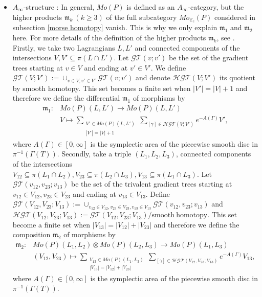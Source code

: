 \documentclass[12pt,reqno]{amsart}
\newcommand{\fm}{{\mathfrak{m}}}
\newcommand{\cE}{{\mathcal{E}}}
\theoremstyle{definition}
\begin{document}
\begin{itemize}
\item $A_\infty$-structure : In general, $Mo(P)$ is defined as an $A_\infty$-category, but the higher products $\fm_k\ (k\geq3)$ of the full subcategory $Mo_{\cE_c}(P)$ considered in subsection \ref{morse homotopy} vanish. 
This is why we only explain $\fm_1$ and $\fm_2$ here. For more details of the definition of the higher products $\fm_k$, see \cite{fut-kaj1}. 
Firstly, we take two Lagrangians $L,L'$ and connected components of the intersections $V,V'\subseteq \pi(L\cap L')$. Let $\mathcal{GT}(v;v')$ be the set of the gradient trees starting at $v\in V$ and ending at $v'\in V'$. We define $\mathcal{GT}(V;V') := \cup_{{v}\in V,v'\in V'}\mathcal{GT}(v;v')$ and denote $\mathcal{HGT}(V;V')$ its quotient by smooth homotopy. This set becomes a finite set when $|V'|=|V|+1$ and therefore we define the differential $\fm_1$ of morphisms by
\begin{equation*}
\begin{split}
\fm_1:&Mo(P)(L,L')\longrightarrow Mo(P)(L,L')\\
&V \longmapsto \sum_{\substack{V'\in Mo(P)(L,L')\\|V'|=|V|+1}}\sum_{[\gamma]\in \mathcal{HGT}(V;V')}e^{-A(\Gamma)}V',
\end{split}
\end{equation*}
where $A(\Gamma)\in[0,\infty]$ is the symplectic area of the piecewise smooth disc in $\pi^{-1}(\Gamma(T))$.
Secondly, take a triple $(L_1,L_2,L_3)$, connected components of the intersections $V_{12}\subseteq \pi(L_1\cap L_2), V_{23}\subseteq\pi(L_2\cap L_3), V_{13}\subseteq\pi(L_1\cap L_3)$. Let $\mathcal{GT}(v_{12},v_{23};v_{13})$ be the set of the trivalent gradient trees starting at $v_{12}\in V_{12}, v_{23}\in V_{23}$ and ending at $v_{13}\in V_{13}$. Define $\mathcal{GT}(V_{12},V_{23};V_{13}) := \cup_{v_{12}\in V_{12},v_{23}\in V_{23},v_{13}\in V_{13}}\mathcal{GT}(v_{12},v_{23};v_{13})$ and $\mathcal{HGT}(V_{12},V_{23};V_{13}):=\mathcal{GT}(V_{12},V_{23};V_{13})/\mathrm{smooth\ homotopy}$. This set become a finite set when $|V_{13}|=|V_{12}|+|V_{23}|$ and therefore we define the composition $\fm_2$ of morphisms by
\begin{equation*}
\begin{split}
\fm_2:&Mo(P)(L_1,L_2)\otimes Mo(P)(L_2,L_3)\longrightarrow Mo(P)(L_1,L_3)\\
&(V_{12},V_{23}) \longmapsto \sum_{\substack{V_{13}\in Mo(P)(L_1,L_3)\\|V_{13}|=|V_{12}|+|V_{23}|}}\sum_{[\gamma]\in \mathcal{HGT}(V_{12},V_{23};V_{13})}e^{-A(\Gamma)}V_{13},
\end{split}
\end{equation*}
where $A(\Gamma)\in[0,\infty]$ is the symplectic area of the piecewise smooth disc in $\pi^{-1}(\Gamma(T))$.
\end{itemize}
\end{document}
